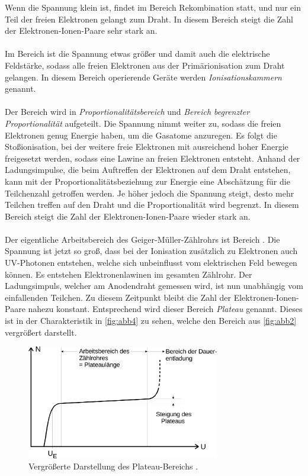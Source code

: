     Wenn die Spannung klein ist, findet im Bereich  Rekombination statt,
    und nur ein Teil der freien Elektronen gelangt zum Draht.
    In diesem Bereich steigt die Zahl der Elektronen-Ionen-Paare sehr stark an.\\
    \\
    Im Bereich  ist die Spannung etwas größer und damit auch die elektrische Feldstärke,
    sodass alle freien Elektronen aus der Primärionisation zum Draht gelangen.
    In diesem Bereich operierende Geräte werden \textit{Ionisationskammern} genannt.\\
    \\
    Der Bereich  wird in \textit{Proportionalitätsbereich} und \textit{Bereich begrenzter Proportionalität} aufgeteilt.
    Die Spannung nimmt weiter zu, sodass die freien Elektronen genug Energie haben,
    um die Gasatome anzuregen.
    Es folgt die Stoßionisation, bei der weitere freie
    Elektronen mit ausreichend hoher Energie freigesetzt werden,
    sodass eine Lawine an freien Elektronen entsteht.
    Anhand der Ladungsimpulse, die beim Auftreffen der Elektronen auf dem Draht entstehen,
    kann mit der Proportionalitätsbeziehung zur Energie
    eine Abschätzung für die Teilchenzahl getroffen werden.
    Je höher jedoch die Spannung steigt,
    desto mehr Teilchen treffen auf den Draht und die Proportionalität wird begrenzt.
    In diesem Bereich steigt die Zahl der Elektronen-Ionen-Paare wieder stark an.\\
    \\
    Der eigentliche Arbeitsbereich des Geiger-Müller-Zählrohrs ist Bereich .
    Die Spannung ist jetzt so groß,
    dass bei der Ionisation zusätzlich zu Elektronen auch UV-Photonen entstehen,
    welche sich unbeinflusst vom elektrischen Feld bewegen können.
    Es entstehen Elektronenlawinen im gesamten Zählrohr.
    Der Ladungsimpuls, welcher am Anodendraht gemessen wird, ist nun unabhängig vom einfallenden Teilchen.
    Zu diesem Zeitpunkt bleibt die Zahl der Elektronen-Ionen-Paare nahezu konstant.
    Entsprechend wird dieser Bereich \textit{Plateau} genannt.
    Dieses ist in der Charakteristik in \autoref{fig:abb4} zu sehen,
    welche den Bereich  aus \autoref{fig:abb2} vergrößert darstellt.

    \begin{figure}
      \centering
      \includegraphics[width=0.75\textwidth]{content/img/V703_Abb4.jpg}
      \caption{Vergrößerte Darstellung des Plateau-Bereichs \cite{versuchsanleitung}.}
      \label{fig:abb4}
    \end{figure}

